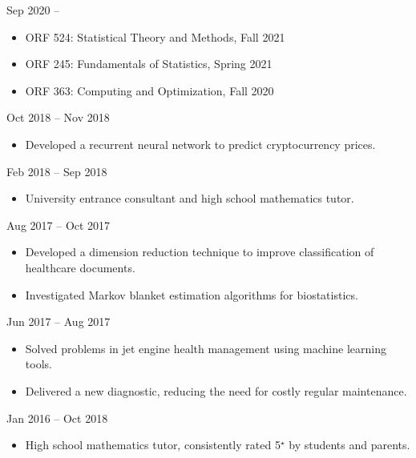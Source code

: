 \documentclass[
  date,
  number,
]{wgu-cv}
\begin{document}
{}
{Sep 2020 --}

\begin{itemize}
  \item
    ORF 524:
    Statistical Theory and Methods,
    Fall 2021
  \item
    ORF 245:
    Fundamentals of Statistics,
    Spring 2021
  \item
    ORF 363:
    Computing and Optimization,
    Fall 2020
\end{itemize}


{}
{Oct 2018 -- Nov 2018}

\begin{itemize}
	\item Developed a recurrent neural network to predict cryptocurrency prices.
\end{itemize}


{}
{Feb 2018 -- Sep 2018}

\begin{itemize}
\item University entrance consultant and high school mathematics tutor.
\end{itemize}


{}
{Aug 2017 -- Oct 2017}

\begin{itemize}
	\item Developed a dimension reduction technique to
    improve classification of healthcare documents.
	\item Investigated Markov blanket estimation algorithms for biostatistics.
\end{itemize}


{}
{Jun 2017 -- Aug 2017}

\begin{itemize}
	\item Solved problems in jet engine health management using machine learning tools.
	\item Delivered a new diagnostic, reducing the need for costly regular maintenance.
\end{itemize}


{}
{Jan 2016 -- Oct 2018}

\begin{itemize}
	\item High school mathematics tutor,
    consistently rated 5$^\star$ by students and parents.
\end{itemize}
\end{document}
